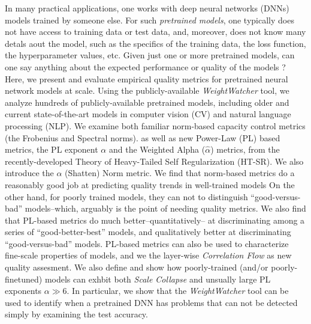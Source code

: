 
In many practical applications, one works with deep neural networks (DNNs) models trained by someone else.
For such \emph{pretrained models}, one typically does not have access to training data or test data, 
and, moreover,  does not know many detals aout the  model, such as
the specifics of the training data, the loss function, the hyperparameter values, etc.
Given just one or more pretrained models, can one say anything about the expected performance or quality of the models ?
Here, we present and evaluate empirical quality metrics for pretrained neural network models at scale.
%
Using the publicly-available \emph{WeightWatcher} tool, we analyze hundreds of publicly-available pretrained models, including older and current state-of-the-art models in computer vision (CV) and natural language processing (NLP).
We examine both familiar norm-based capacity control metrics (the Frobenius and  Spectral norms). as well as
new Power-Law (PL) based metrics, the PL exponent $\alpha$ and the Weighted Alpha ($\hat{\alpha}$) metrics,
from the recently-developed Theory of Heavy-Tailed Self Regularization (HT-SR).
We also introduce the $\alpha$ (Shatten) Norm metric.
We find that norm-based metrics do a reasonably good job at predicting quality trends in well-trained models
On the other hand, for poorly trained models, they can not  to distinguish ``good-versus-bad'' models--which, 
arguably is the point of needing quality metrics.
We also find that PL-based metrics do much better--quantitatively-- at discriminating among
a series of ``good-better-best'' models, and qualitatively better at discriminating ``good-versus-bad'' models.
PL-based metrics can also be used to characterize fine-scale properties of models, and
we the layer-wise \emph{Correlation Flow} as new quality assesment.
We also define and show how poorly-trained (and/or poorly-finetuned) models can exhbit both \emph{Scale Collapse}
and unsually large PL exponents $\alpha\gg 6$.  In particular, we show that the \emph{WeightWatcher} tool
can be used to identify when a pretrained DNN has problems that can not be detected simply
by examining the test accuracy.




